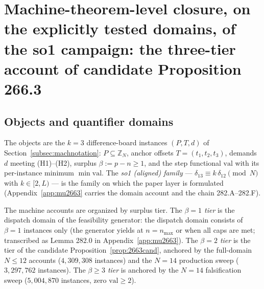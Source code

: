 \section{Machine-theorem-level closure, on the explicitly tested domains, of the
so1 campaign: the three-tier
account of candidate Proposition 266.3}\label{sec:machine}

\subsection{Objects and quantifier domains}\label{subsec:macobj}

The objects are the $k=3$ difference-board instances $(P,T,d)$ of
Section~\ref{subsec:machnotation}: $P\subseteq\mathbb{Z}_N$, anchor offsets
$T=(t_1,t_2,t_3)$, demands $d$ meeting (H1)--(H2), surplus $\beta:=p-n\ge1$, and the
step functional $\mathrm{val}$ with its per-instance minimum $\min\mathrm{val}$. The
\emph{so1 (aligned) family} --- $\delta_{13}\equiv k\,\delta_{12}\pmod N$ with
$k\in[2,L)$ --- is the family on which the paper layer is formulated
(Appendix~\ref{app:mu2663} carries the domain account and the chain
282.A--282.F).

The machine accounts are organized by surplus tier. The \emph{$\beta=1$ tier} is the
dispatch domain of the feasibility generator: the dispatch domain consists of $\beta=1$
instances only (the generator yields at $n=n_{\max}$ or when all caps are met;
transcribed as Lemma 282.0 in Appendix~\ref{app:mu2663}). The \emph{$\beta=2$ tier} is the
tier of the candidate Proposition~\ref{prop:2663cand}, anchored by the full-domain
$N\le12$ accounts ($4{,}309{,}308$ instances) and the $N=14$ production sweep
($3{,}297{,}762$ instances). The \emph{$\beta\ge3$ tier} is anchored by the $N=14$
falsification sweep ($5{,}004{,}870$ instances, zero $\mathrm{val}\ge2$).

